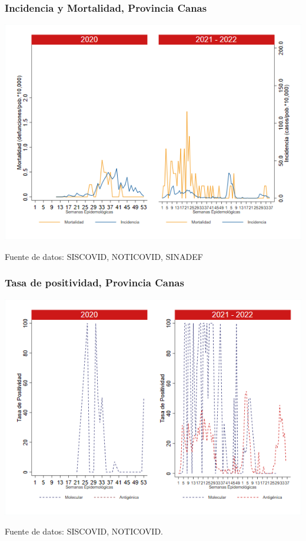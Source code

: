 \documentclass[xcolor=table]{beamer}
\begin{document}
\begin{frame}[label=Canas]
	\frametitle{Incidencia y Mortalidad, Provincia Canas}
	\vspace{-.5cm}
	\begin{center}
		\includegraphics[width=0.8\linewidth, trim={0cm .5cm 0cm 0.2cm},clip]{../figuras/incidencia_mortalidad_20_21_4.png}
	\end{center}
	{\tiny Fuente de datos: SISCOVID, NOTICOVID, SINADEF}
\end{frame}

\begin{frame}
	\frametitle{Tasa de positividad, Provincia Canas}
	\vspace{-.5cm}
	\begin{center}
		\includegraphics[width=0.8\linewidth, trim={0cm .5cm 0cm 0.2cm},clip]{../figuras/positividad_20_21_4.png}
	\end{center}
	{\tiny Fuente de datos: SISCOVID, NOTICOVID.}
\end{frame}
\end{document}

